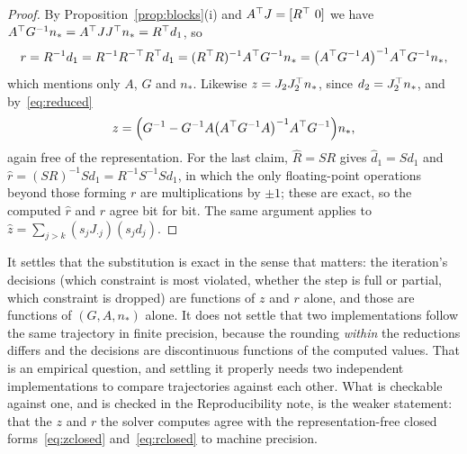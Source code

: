 \begin{proof}
By Proposition~\ref{prop:blocks}(i) and $A^{\top} J = [R^{\top}\ 0]$ we have
$A^{\top} G^{-1} n_* = A^{\top} J J^{\top} n_* = R^{\top} d_1$, so
\begin{equation}
  r = R^{-1}d_1 = R^{-1}R^{-\top}R^{\top} d_1 = (R^{\top} R)^{-1} A^{\top} G^{-1} n_*
    = \bigl(A^{\top} G^{-1}A\bigr)^{-1} A^{\top} G^{-1} n_* ,
  \label{eq:rclosed}
\end{equation}
which mentions only $A$, $G$ and $n_*$. Likewise $z = J_2 J_2^{\top} n_*$, since
$d_2 = J_2^{\top} n_*$, and by~\eqref{eq:reduced}
\begin{equation}
  z = \Bigl(G^{-1} - G^{-1}A\bigl(A^{\top} G^{-1}A\bigr)^{-1}A^{\top} G^{-1}\Bigr) n_*,
  \label{eq:zclosed}
\end{equation}
again free of the representation. For the last claim, $\hat R = SR$ gives
$\hat d_1 = S d_1$ and $\hat r = (SR)^{-1}Sd_1 = R^{-1}S^{-1}Sd_1$, in which the
only floating-point operations beyond those forming $r$ are multiplications by
$\pm1$; these are exact, so the computed $\hat r$ and $r$ agree bit for bit. The
same argument applies to $\hat z = \sum_{j>k}(s_j J_{\cdot j})(s_j d_j)$.
\end{proof}

\begin{remark}
It settles that the substitution is exact in the sense that matters: the
iteration's decisions (which constraint is most violated, whether the step is full
or partial, which constraint is dropped) are functions of $z$ and $r$
alone, and those are functions of $(G,A,n_*)$ alone. It does not settle that two
implementations follow the same trajectory in finite precision, because the
rounding \emph{within} the reductions differs and the decisions are
discontinuous functions of the computed values. That is an empirical question,
and settling it properly needs two independent implementations to compare
trajectories against each other. What is checkable against one, and is checked in
the Reproducibility note, is the weaker statement: that the $z$ and $r$ the solver
computes agree with the representation-free closed forms~\eqref{eq:zclosed}
and~\eqref{eq:rclosed} to machine precision.
\end{remark}
